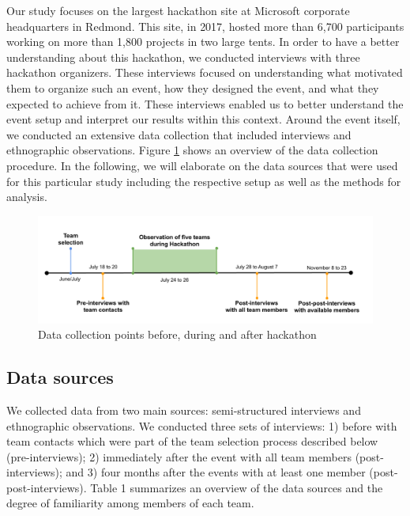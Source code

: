 \documentclass{hcij}
\begin{document}
Our study focuses on the largest hackathon site at Microsoft corporate headquarters in Redmond. This site, in 2017, hosted more than 6,700 participants working on more than 1,800 projects in two large tents. In order to have a better understanding about this hackathon, we conducted interviews with three hackathon organizers. These interviews focused on understanding what motivated them to organize such an event, how they designed the event, and what they expected to achieve from it. These interviews enabled us to better understand the event setup and interpret our results within this context. Around the event itself, we conducted an extensive data collection that included interviews and ethnographic observations. Figure \ref{fig:timeline} shows an overview of the data collection procedure. In the following, we will elaborate on the data sources that were used for this particular study including the respective setup as well as the methods for analysis.

\begin{figure}[b]
\centering
\includegraphics[width=6in]{hackathon-timeline.png}
\caption{Data collection points before, during and after hackathon}
\label{fig:timeline}
\end{figure}


\subsection{Data sources}
We collected data from two main sources: semi-structured interviews and ethnographic observations. We conducted three sets of interviews: 1) before with team contacts which were part of the team selection process described below (pre-interviews); 2) immediately after the event with all team members (post-interviews); and 3) four months after the events with at least one member (post-post-interviews). Table 1 summarizes an overview of the data sources and the degree of familiarity among members of each team.
\end{document}
